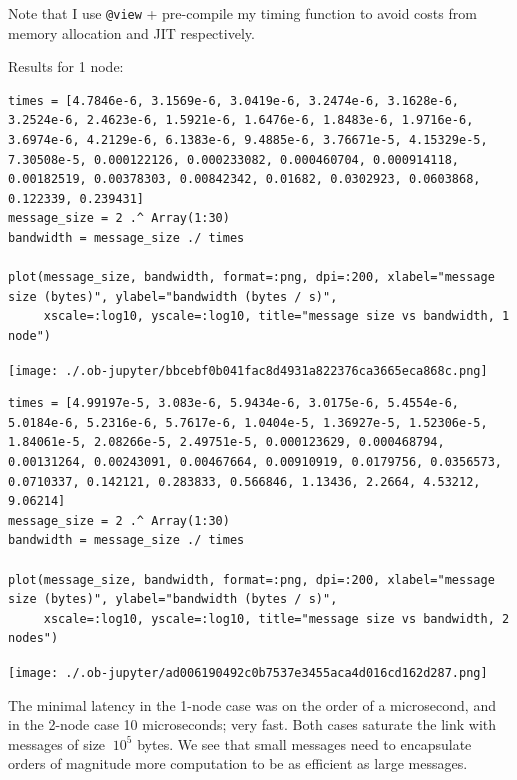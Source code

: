 \documentclass[nobib]{tufte-handout}
\begin{document}
Note that I use \texttt{@view} + pre-compile my timing function to avoid costs from memory allocation and JIT respectively.

Results for 1 node:

\begin{verbatim}
times = [4.7846e-6, 3.1569e-6, 3.0419e-6, 3.2474e-6, 3.1628e-6, 3.2524e-6, 2.4623e-6, 1.5921e-6, 1.6476e-6, 1.8483e-6, 1.9716e-6, 3.6974e-6, 4.2129e-6, 6.1383e-6, 9.4885e-6, 3.76671e-5, 4.15329e-5, 7.30508e-5, 0.000122126, 0.000233082, 0.000460704, 0.000914118, 0.00182519, 0.00378303, 0.00842342, 0.01682, 0.0302923, 0.0603868, 0.122339, 0.239431]
message_size = 2 .^ Array(1:30)
bandwidth = message_size ./ times

plot(message_size, bandwidth, format=:png, dpi=:200, xlabel="message size (bytes)", ylabel="bandwidth (bytes / s)",
     xscale=:log10, yscale=:log10, title="message size vs bandwidth, 1 node")
\end{verbatim}

\begin{center}
\texttt{[image: ./.ob-jupyter/bbcebf0b041fac8d4931a822376ca3665eca868c.png]}
\end{center}

\begin{verbatim}
times = [4.99197e-5, 3.083e-6, 5.9434e-6, 3.0175e-6, 5.4554e-6, 5.0184e-6, 5.2316e-6, 5.7617e-6, 1.0404e-5, 1.36927e-5, 1.52306e-5, 1.84061e-5, 2.08266e-5, 2.49751e-5, 0.000123629, 0.000468794, 0.00131264, 0.00243091, 0.00467664, 0.00910919, 0.0179756, 0.0356573, 0.0710337, 0.142121, 0.283833, 0.566846, 1.13436, 2.2664, 4.53212, 9.06214]
message_size = 2 .^ Array(1:30)
bandwidth = message_size ./ times

plot(message_size, bandwidth, format=:png, dpi=:200, xlabel="message size (bytes)", ylabel="bandwidth (bytes / s)",
     xscale=:log10, yscale=:log10, title="message size vs bandwidth, 2 nodes")
\end{verbatim}

\begin{center}
\texttt{[image: ./.ob-jupyter/ad006190492c0b7537e3455aca4d016cd162d287.png]}
\end{center}

The minimal latency in the 1-node case was on the order of a microsecond, and in the 2-node case 10 microseconds; very fast. Both cases saturate the
link with messages of size \(~10^5\) bytes. We see that small messages need to encapsulate orders of magnitude more computation to be as efficient as
large messages.
\end{document}
